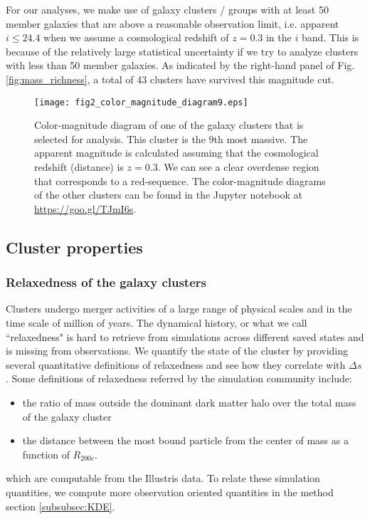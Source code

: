 For our analyses, we make use of galaxy clusters / groups 
with at least 50 member galaxies that are above a reasonable observation limit, 
i.e. apparent $i \leq 24.4$ when we assume a cosmological redshift of $z = 0.3$
in the $i$ band. 
This is because of the relatively large statistical uncertainty if we try
to analyze clusters with less than 50 member galaxies. 
As indicated by the right-hand panel of Fig. \ref{fig:mass_richness}, a total of 43 clusters have 
survived this magnitude cut. 

\begin{figure}
	\centering
	\texttt{[image: fig2\_color\_magnitude\_diagram9.eps]}
	\caption{Color-magnitude diagram of one of the galaxy clusters that is selected for 
		analysis. This cluster is the 9th most massive. 
		The apparent magnitude is calculated assuming that 
		the cosmological redshift (distance) is $z = 0.3$. 
		We can see a clear overdense region that corresponds to a red-sequence.
		The color-magnitude diagrams of the other clusters can be found in the
		Jupyter notebook at \href{https://github.com/karenyyng/galaxy_DM_offset/blob/master/code/analyses/fig2_color_magnitude_diagram.ipynb}{https://goo.gl/TJmI6s}.
		\label{fig:color_magnitude_diagram}
	} 
\end{figure}




\subsection{Cluster properties}
\label{subsubsec:cluster_properties}

\subsubsection{Relaxedness of the galaxy clusters}

Clusters undergo merger activities of a large range of physical scales and 
in the time scale of million of years. 
The dynamical history, or what we call ``relaxedness" is hard to retrieve from 
simulations across different saved states and is missing from observations.
We quantify the state of the cluster by providing several quantitative
definitions of relaxedness and see how they correlate with $\Delta s$.
Some definitions of relaxedness referred by the simulation community
include:
\begin{itemize}
	\item the ratio of mass outside the dominant dark matter halo over the total mass
		of the galaxy cluster 
	\item the distance between the most bound particle from the center of mass as a
		function of $R_{200c}$.
\end{itemize}
which are computable from the Illustris data. 
To relate these simulation quantities, we compute more observation oriented 
quantities in the method section \ref{subsubsec:KDE}. 


